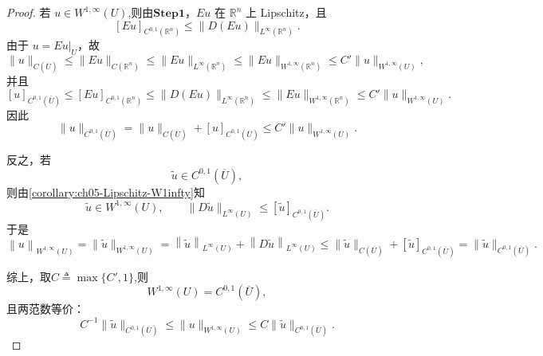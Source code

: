 \documentclass[../../main.tex]{subfiles}
\begin{document}
\begin{proof}
若 \(u\in W^{1,\infty}(U)\),则由$\mathbf{Step}\mathbf{1}$，\(Eu\) 在 \(\mathbb R^n\) 上 Lipschitz，且
\[
\left[ Eu \right] _{C^{0,1}\left( \mathbb{R} ^n \right)}
\leqslant
\|D(Eu)\|_{L^\infty(\mathbb R^n)}.
\]
由于 \(u=Eu|_U\)，故
\[
\|u\|_{C(\overline U)}
\leqslant
\|Eu\|_{C(\mathbb R^n)}
\leqslant
\|Eu\|_{L^\infty(\mathbb R^n)}
\leqslant
\|Eu\|_{W^{1,\infty}(\mathbb R^n)}
\leqslant
C'\|u\|_{W^{1,\infty}(U)},
\]
并且
\[
[u]_{C^{0,1}(\overline U)}
\leqslant
\left[ Eu \right] _{C^{0,1}\left( \mathbb{R} ^n \right)}
\leqslant
\|D(Eu)\|_{L^\infty(\mathbb R^n)}
\leqslant
\|Eu\|_{W^{1,\infty}(\mathbb R^n)}
\leqslant
C'\|u\|_{W^{1,\infty}(U)}.
\]
因此
\[
\|u\|_{C^{0,1}(\overline U)}=\|u\|_{C(\overline U)}+[u]_{C^{0,1}(\overline U)}
\leqslant
C'\|u\|_{W^{1,\infty}(U)}.
\]

反之，若
\[
\widetilde u\in C^{0,1}(\overline U),
\]
则由\cref{corollary:ch05-Lipschitz-W1infty}知
\[
\widetilde u\in W^{1,\infty}(U),\qquad \|D\widetilde u\|_{L^\infty(U)}
\leqslant
\left[ \widetilde{u} \right] _{C^{0,1}\left( \overline{U} \right)}.
\]
于是
\[
\left\| u \right\| _{W^{1,\infty}(U)}=\|\widetilde u\|_{W^{1,\infty}(U)}=\left\| \widetilde{u} \right\| _{L^{\infty}(U)}+\left\| D\widetilde{u} \right\| _{L^{\infty}(U)}
\leqslant
\|\widetilde u\|_{C(\overline U)}
+
\left[ \widetilde{u} \right] _{C^{0,1}\left( \overline{U} \right)}
=
\|\widetilde u\|_{C^{0,1}(\overline U)}.
\]

综上，取$C\triangleq \max\{C',1\}$,则
\[
W^{1,\infty}(U)=C^{0,1}(\overline U),
\]
且两范数等价：
\[
C^{-1}\|\widetilde u\|_{C^{0,1}(\overline U)}
\leqslant
\|u\|_{W^{1,\infty}(U)}
\leqslant
C\|\widetilde u\|_{C^{0,1}(\overline U)}.
\]
\end{proof}
\end{document}
